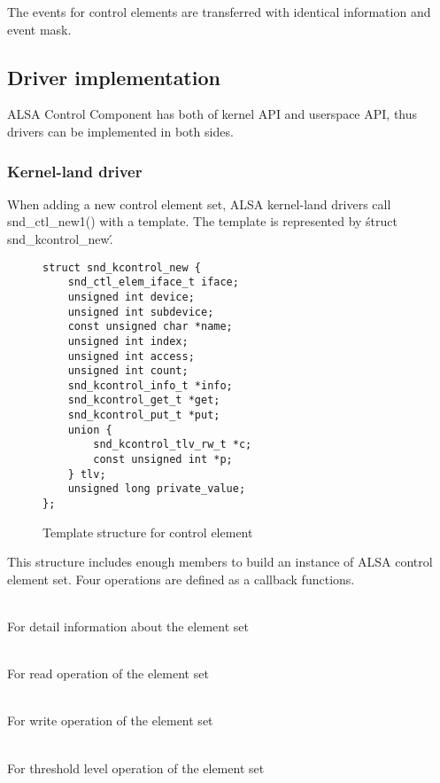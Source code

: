 \documentclass[onecolumn]{article}
\begin{document}
The events for control elements are transferred with identical information and event mask.

\subsection{Driver implementation}

ALSA Control Component has both of kernel API and userspace API, thus drivers can be implemented in both sides.

\subsubsection{Kernel-land driver}

When adding a new control element set, ALSA kernel-land drivers call snd\_ctl\_new1() with a template. The template is represented by \'struct snd\_kcontrol\_new\'.

\begin{figure}[htbp]
\small
\begin{verbatim}
struct snd_kcontrol_new {
    snd_ctl_elem_iface_t iface;
    unsigned int device;
    unsigned int subdevice;
    const unsigned char *name;
    unsigned int index;
    unsigned int access;
    unsigned int count;
    snd_kcontrol_info_t *info;
    snd_kcontrol_get_t *get;
    snd_kcontrol_put_t *put;
    union {
        snd_kcontrol_tlv_rw_t *c;
        const unsigned int *p;
    } tlv;
    unsigned long private_value;
};
\end{verbatim}
\caption{{Template structure for control element}}
\label{control-element-template}
\end{figure}

This structure includes enough members to build an instance of ALSA control element set. Four operations are defined as a callback functions.

\begin{description}
\small
\item[snd\_kcontrol\_info\_t] \mbox{} \\
For detail information about the element set
\item[snd\_kcontrol\_get\_t] \mbox{} \\
For read operation of the element set
\item[snd\_kcontrol\_put\_t] \mbox{} \\
For write operation of the element set
\item[snd\_kctl\_tlv\_rw\_t] \mbox{} \\
For threshold level operation of the element set
\end{description}
\end{document}
